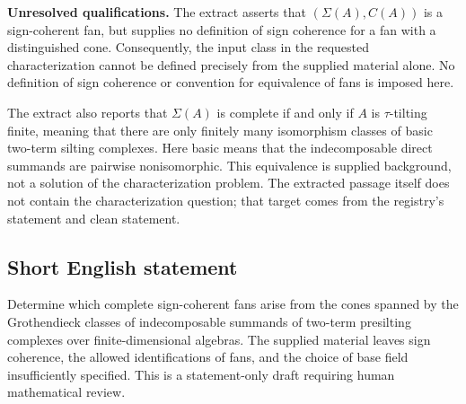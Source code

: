 \documentclass[11pt]{article}
\begin{document}
\textbf{Unresolved qualifications.} The extract asserts that \((\Sigma(A),C(A))\) is a sign-coherent fan, but supplies no definition of sign coherence for a fan with a distinguished cone. Consequently, the input class in the requested characterization cannot be defined precisely from the supplied material alone. No definition of sign coherence or convention for equivalence of fans is imposed here.

The extract also reports that \(\Sigma(A)\) is complete if and only if \(A\) is \(\tau\)-tilting finite, meaning that there are only finitely many isomorphism classes of basic two-term silting complexes. Here basic means that the indecomposable direct summands are pairwise nonisomorphic. This equivalence is supplied background, not a solution of the characterization problem. The extracted passage itself does not contain the characterization question; that target comes from the registry's statement and clean statement.
\subsection{Short English statement}
Determine which complete sign-coherent fans arise from the cones spanned by the Grothendieck classes of indecomposable summands of two-term presilting complexes over finite-dimensional algebras. The supplied material leaves sign coherence, the allowed identifications of fans, and the choice of base field insufficiently specified. This is a statement-only draft requiring human mathematical review.
\end{document}
